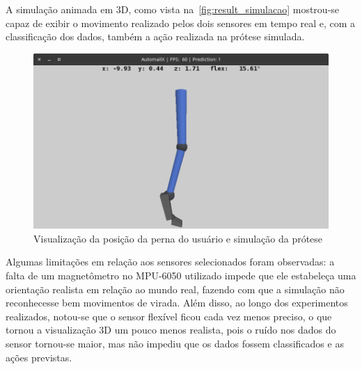 
A simulação animada em 3D, como vista na~\autoref{fig:result_simulacao} mostrou-se capaz de exibir o movimento realizado pelos dois sensores em tempo real e, com a classificação dos dados, também a ação realizada na prótese simulada.

\begin{figure}[ht]
	\caption{\label{fig:result_simulacao}Visualização da posição da perna do usuário e simulação da prótese}
	\begin{center}
	    \includegraphics[width=.8\textwidth]{resources/result_simulacao}
	\end{center}
\end{figure}

Algumas limitações em relação aos sensores selecionados foram observadas: a falta de um magnetômetro no MPU-6050 utilizado impede que ele estabeleça uma orientação realista em relação ao mundo real, fazendo com que a simulação não reconhecesse bem movimentos de virada. Além disso, ao longo dos experimentos realizados, notou-se que o sensor flexível ficou cada vez menos preciso, o que tornou a visualização 3D um pouco menos realista, pois o ruído nos dados do sensor tornou-se maior, mas não impediu que os dados fossem classificados e as ações previstas.